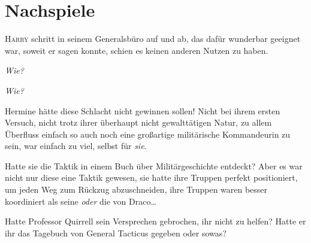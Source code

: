 
\section{Nachspiele}

\lettrine{H}{arry} schritt in seinem Generalsbüro auf und ab, das dafür wunderbar geeignet war, soweit er sagen konnte, schien es keinen anderen Nutzen zu haben.

\emph{Wie?}

\emph{Wie?}

Hermine hätte diese Schlacht nicht gewinnen sollen! Nicht bei ihrem ersten Versuch, nicht trotz ihrer überhaupt nicht gewalttätigen Natur, zu allem Überfluss einfach so auch noch eine großartige militärische Kommandeurin zu sein, war einfach zu viel, selbst für \emph{sie}.

Hatte sie die Taktik in einem Buch über Militärgeschichte entdeckt? Aber es war nicht nur diese eine Taktik gewesen, sie hatte ihre Truppen perfekt positioniert, um jeden Weg zum Rückzug abzuschneiden, ihre Truppen waren besser koordiniert als seine \emph{oder} die von Draco…

Hatte Professor Quirrell sein Versprechen gebrochen, ihr nicht zu helfen? Hatte er ihr das Tagebuch von General Tacticus gegeben oder sowas?%

